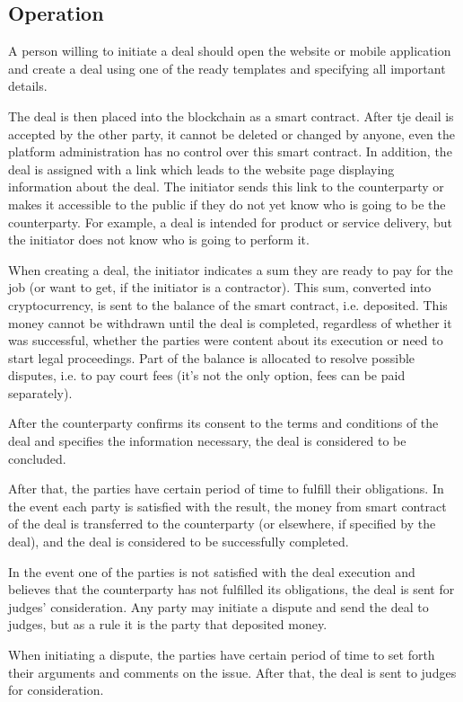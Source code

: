 \documentclass[12pt]{article}
\begin{document}
\subsection{Operation} A person willing to initiate a deal should open the website or mobile application and create a deal using one of the
ready templates and specifying all important details.

The deal is then placed into the blockchain as a smart contract. After tje deail is accepted by the other party, it
cannot be deleted or changed by anyone, even the platform administration has no control over this smart contract. In
addition, the deal is assigned with a link which leads to the website page displaying information about the deal. The
initiator sends this link to the counterparty or makes it accessible to the public if they do not yet know who is going
to be the counterparty. For example, a deal is intended for product or service delivery, but the initiator does not know
who is going to perform it.

When creating a deal, the initiator indicates a sum they are ready to pay for the job (or want to get, if the initiator
is a contractor).  This sum, converted into cryptocurrency, is sent to the balance of the smart contract, i.e.
deposited. This money cannot be withdrawn until the deal is completed, regardless of whether it was successful, whether
the parties were content about its execution or need to start legal proceedings. Part of the balance is allocated to
resolve possible disputes, i.e. to pay court fees (it’s not the only option, fees can be paid separately).

After the counterparty confirms its consent to the terms and conditions of the deal and specifies the information necessary, the deal is
considered to be concluded.

After that, the parties have certain period of time to fulfill their obligations. In the event each party is satisfied with the result, the
money from smart contract of the deal is transferred to the counterparty (or elsewhere, if specified by the deal), and the deal is
considered to be successfully completed.

In the event one of the parties is not satisfied with the deal execution and believes that the counterparty has not fulfilled its
obligations, the deal is sent for judges’ consideration. Any party may initiate a dispute and send the deal to judges, but as a rule it is
the party that deposited money.

When initiating a dispute, the parties have certain period of time to set forth their arguments and comments on the issue. After that, the
deal is sent to judges for consideration.
\end{document}
